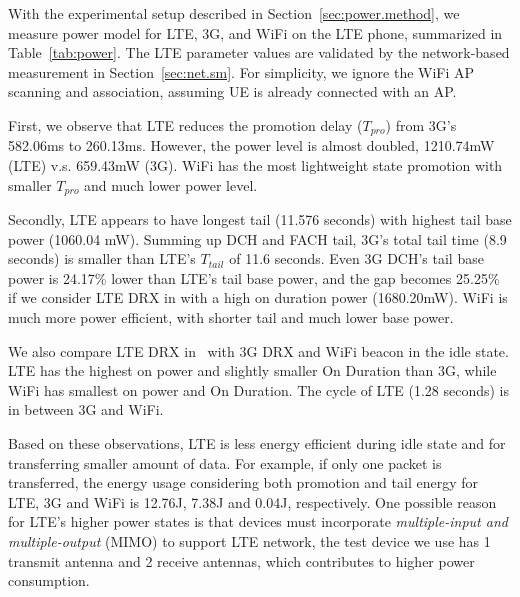 \label{sec:power.rrc}

With the experimental setup described in Section~\ref{sec:power.method}, we measure power model for LTE, 3G, and WiFi on the LTE phone, summarized in Table~\ref{tab:power}. The LTE parameter values are validated by the network-based measurement in Section~\ref{sec:net.sm}. For simplicity, we ignore the WiFi AP scanning and association, assuming UE is already connected with an AP.

First, we observe that LTE reduces the promotion delay ($T_{pro}$) from 3G's 582.06ms to 260.13ms. However, the power level is almost doubled, \ie 1210.74mW (LTE) v.s. 659.43mW (3G). WiFi has the most lightweight state promotion with smaller $T_{pro}$ and much lower power level.

Secondly, LTE appears to have longest tail (11.576 seconds) with highest tail base power (1060.04 mW). Summing up DCH and FACH tail, 3G's total tail time (8.9 seconds) is smaller than LTE's $T_{tail}$ of 11.6 seconds. Even 3G DCH's tail base power is 24.17\% lower than LTE's tail base power, and the gap becomes 25.25\% if we consider LTE DRX in \RC with a high on duration power (1680.20mW). WiFi is much more power efficient, with shorter tail and much lower base power.

We also compare LTE DRX in \RI~with 3G DRX and WiFi beacon in the idle state. LTE has the highest on power and slightly smaller On Duration than 3G, while WiFi has smallest on power and On Duration. The cycle of LTE (1.28 seconds) is in between 3G and WiFi.

Based on these observations, LTE is less energy efficient during idle state and for transferring smaller amount of data. For example, if only one packet is transferred, the energy usage considering both promotion and tail energy for LTE, 3G and WiFi is 12.76J, 7.38J and 0.04J, respectively. One possible reason for LTE's higher power states is that devices must incorporate {\em multiple-input and multiple-output} (MIMO) to support LTE network, \eg the test device we use has 1 transmit antenna and 2 receive antennas, which contributes to higher power consumption.


